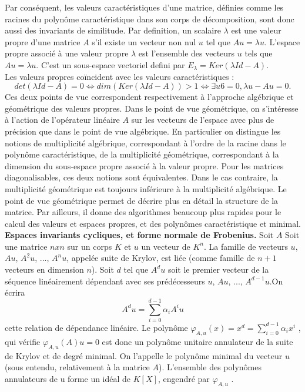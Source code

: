 Par conséquent, les valeurs caractéristiques d’une matrice, définies comme les racines du polynôme caractéristique dans son corps de décomposition, sont donc aussi des invariants de similitude. Par definition, un scalaire $\lambda$ est une valeur propre d’une matrice $A$ s’il existe un vecteur non nul $u$ tel que $Au = \lambda u$. L'espace propre associé à une valeur propre $\lambda$ est l’ensemble des vecteurs $u$ tels que $Au = \lambda u$. C'est un sous-espace vectoriel defini par $E_{\lambda} = Ker(\lambda Id - A)$. \\
Les valeurs propres coïncident avec les valeurs caractéristiques :
\[
 det(\lambda Id - A) = 0 \Leftrightarrow dim(Ker(\lambda Id - A)) > 1 \Leftrightarrow \exists u 6= 0, \lambda u - Au = 0.
\]
Ces deux points de vue correspondent respectivement à l’approche algébrique et géométrique des valeurs propres. Dans le point de vue géométrique, on s’intéresse à l’action de l’opérateur linéaire $A$ sur les vecteurs de l’espace avec plus de précision que dans le point de vue algébrique. En particulier on distingue les notions de
multiplicité algébrique, correspondant à l’ordre de la racine dans le polynôme caractéristique, de la multiplicité géométrique, correspondant à la dimension du sous-espace propre associé à la valeur propre. Pour les matrices diagonalisables, ces deux notions sont équivalentes. Dans le cas contraire, la multiplicité géométrique est toujours inférieure à la multiplicité algébrique. Le point de vue géométrique permet de décrire plus en détail la structure de la matrice. Par ailleurs, il donne des algorithmes beaucoup plus rapides pour le
calcul des valeurs et espaces propres, et des polynômes caractéristique et minimal.
\\
\textbf{Espaces invariants cycliques, et forme normale de Frobenius.} Soit $A$ Soit une matrice $n x n$ sur un 
corps $K$ et $u$ un vecteur de $K^{n}$. La famille de vecteurs $u$, $Au$, $A^{2}u$, ..., $A^{n}u$, appelée suite de 
Krylov, est liée (comme famille de $n + 1$ vecteurs en dimension $n$). Soit $d$ tel que $A^{d} u$ soit le
premier vecteur de la séquence linéairement dépendant avec ses prédécesseurs $u$, $Au$, ..., $A^{d-1}u$.On 
écrira
\[
	A^{d}u = \sum_{i=0}^{d-1} \alpha_{i} A^{i}u
\]
cette relation de dépendance linéaire. Le polynôme $\varphi_{A, u}\left(x\right) = x^{d} = \sum_{i=0}^{d-1} \alpha_{i}x^{i}$ , qui vérifie $\varphi_{A, u}\left(A\right)u = 0$ est donc un polynôme unitaire annulateur de la suite de Krylov et de degré minimal. On l’appelle le polynôme minimal du vecteur $u$ (sous
entendu, relativement à la matrice $A$). L’ensemble des polynômes annulateurs de u forme un idéal de $K\left[X\right]$, engendré par $\varphi_{A, u}$ .
